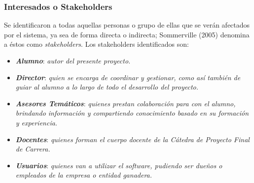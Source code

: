 \documentclass[11pt,oneside]{book}
\begin{document}
\subsubsection{Interesados o Stakeholders}
Se identificaron a todas aquellas personas o grupo de ellas que se verán afectados por el sistema, ya sea de forma directa o indirecta; Sommerville (2005) denomina a éstos como \textit{stakeholders}. Los stakeholders identificados son: 
\begin{itemize}
\item \textit{\textbf{Alumno}}: \textit{autor del presente proyecto.}
\item \textit{\textbf{Director}}: \textit{quien se encarga de coordinar y gestionar, como así también de guiar al alumno a lo largo de todo el desarrollo del proyecto.}
\item \textit{\textbf{Asesores Temáticos}}: \textit{quienes prestan colaboración para con el alumno, brindando información y compartiendo conocimiento basado en su formación y experiencia.}
\item \textit{\textbf{Docentes}}: \textit{quienes forman el cuerpo docente de la Cátedra de Proyecto Final de Carrera.}
\item \textit{\textbf{Usuarios}}: \textit{quienes van a utilizar el software, pudiendo ser dueños o empleados de la empresa o entidad ganadera.}
\end{itemize}

\newpage
\end{document}
